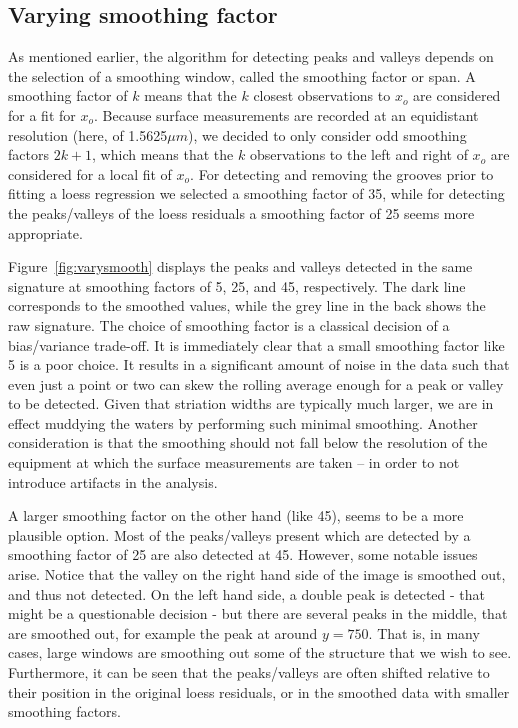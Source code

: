 \documentclass[aoas, preprint]{imsart}\usepackage[]{graphicx}\usepackage[]{color}
\begin{document}
\subsection{Varying smoothing factor}\label{sec:smoothing}
As mentioned earlier, the algorithm for detecting peaks and valleys depends on the selection of a smoothing window, called the smoothing factor or span. A smoothing factor of $k$ means that the  $k$ closest observations to $x_o$ are considered for a fit for $x_o$. Because surface measurements are recorded at an equidistant resolution (here, of 1.5625$\mu m$), we decided to only consider odd smoothing factors $2k + 1$, which means that the  $k$ observations to the left and right of $x_o$ are considered for a local fit of $x_o$. For detecting and removing the grooves prior to fitting a loess regression we selected a smoothing factor  of 35, while for detecting the peaks/valleys of the loess residuals a smoothing factor of 25 seems more appropriate. %

Figure~\ref{fig:varysmooth} displays the  peaks and valleys detected in the same signature at smoothing factors of 5, 25, and 45, respectively. The dark line corresponds to the smoothed values, while the grey line in the back shows the raw signature. The choice of smoothing factor is a classical decision of a bias/variance trade-off. It is immediately clear that a small smoothing factor like 5 is a poor choice. It results in a significant amount of noise in the data such that even just a point or two can skew the rolling average enough for a peak or valley to be detected. Given that striation widths are typically much larger, we are in effect muddying the waters by performing such minimal smoothing. Another consideration is that the smoothing should not fall below the  resolution of the equipment at which the surface measurements are taken -- in order to not introduce artifacts in the analysis. 

A larger smoothing factor on the other hand (like 45), seems to be a more plausible option. Most of the peaks/valleys present which are detected by a smoothing factor of 25 are also detected at 45. However, some notable issues arise. Notice that the valley on the right hand side of the image is smoothed out, and thus not detected. On the left hand side, a double peak is detected - that might be a questionable decision - but there are several peaks in the middle, that are smoothed out, for example the peak at around $y = 750$. That is, in many cases, large windows are smoothing out some of the structure that we wish to see. Furthermore, it can be seen that the peaks/valleys are often shifted relative to their position in the original loess residuals, or in the smoothed data with smaller smoothing factors.
\end{document}
